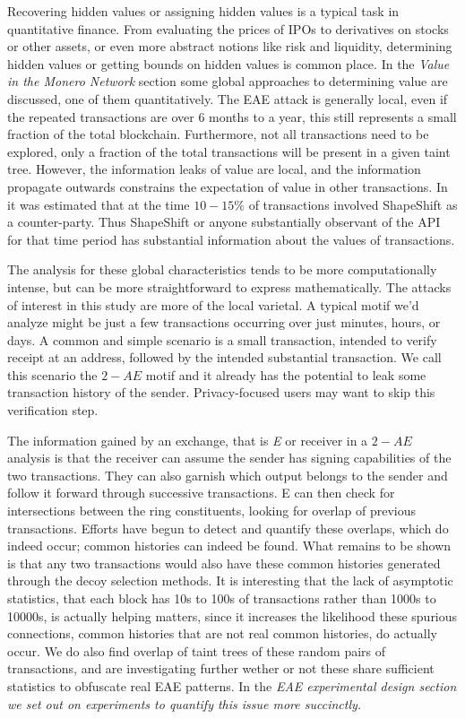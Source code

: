 Recovering hidden values or assigning hidden values is a typical task in quantitative finance.  
From evaluating the prices of IPOs to derivatives on stocks or other assets, or even more abstract notions like risk and liquidity, determining hidden values or getting bounds on hidden values is common place.  
In the \textit{Value in the Monero Network} section some global approaches to determining value are discussed, one of them quantitatively.  
The EAE attack is generally local, even if the repeated transactions are over 6 months to a year, this still represents a small fraction of the total blockchain.  
Furthermore, not all transactions need to be explored, only a fraction of the total transactions will be present in a given taint tree.
However, the information leaks of value are local, and the information propagate outwards constrains the expectation of value in other transactions.
In \cite{Borggren2020} it was estimated that at the time $10-15\%$ of transactions involved ShapeShift as a counter-party.
Thus ShapeShift or anyone substantially observant of the API for that time period has substantial information about the values of transactions.

The analysis for these global characteristics tends to be more computationally intense, but can be more straightforward to express mathematically.
The attacks of interest in this study are more of the local varietal.
A typical motif we'd analyze might be just a few transactions occurring over just minutes, hours, or days.
A common and simple scenario is a small transaction, intended to verify receipt at an address, followed by the intended substantial transaction.
We call this scenario the $2-AE$ motif and it already has the potential to leak some transaction history of the sender.
Privacy-focused users may want to skip this verification step.

The information gained by an exchange, that is \textit{E} or receiver in a $2-AE$ analysis is that the receiver can assume the sender has signing capabilities of the two transactions.
They can also garnish which output belongs to the sender and follow it forward through successive transactions.
E can then check for intersections between the ring constituents, looking for overlap of previous transactions.
Efforts have begun to detect and quantify these overlaps, which do indeed occur; common histories can indeed be found. 
What remains to be shown is that any two transactions would also have these common histories generated through the decoy selection methods.
It is interesting that the lack of asymptotic statistics, that each block has 10s to 100s of transactions rather than 1000s to 10000s, is actually helping matters, since it increases the likelihood these spurious connections, common histories that are not real common histories, do actually occur.
We do also find overlap of taint trees of these random pairs of transactions, and are investigating further wether or not these share sufficient statistics to obfuscate real EAE patterns.
In the \textit{EAE experimental design section we set out on experiments to quantify this issue more succinctly.}

